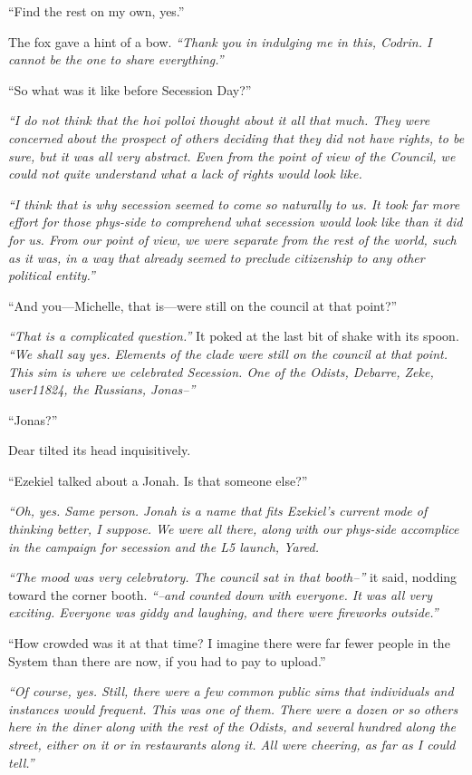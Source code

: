 ``Find the rest on my own, yes.''

The fox gave a hint of a bow. \emph{``Thank you in indulging me in this, Codrin. I cannot be the one to share everything.''}

``So what was it like before Secession Day?''

\emph{``I do not think that the hoi polloi thought about it all that much. They were concerned about the prospect of others deciding that they did not have rights, to be sure, but it was all very abstract. Even from the point of view of the Council, we could not quite understand what a lack of rights would look like.}

\emph{``I think that is why secession seemed to come so naturally to us. It took far more effort for those phys-side to comprehend what secession would look like than it did for us. From our point of view, we were separate from the rest of the world, such as it was, in a way that already seemed to preclude citizenship to any other political entity.''}

``And you---Michelle, that is---were still on the council at that point?''

\emph{``That is a complicated question.''} It poked at the last bit of shake with its spoon. \emph{``We shall say yes. Elements of the clade were still on the council at that point. This sim is where we celebrated Secession. One of the Odists, Debarre, Zeke, user11824, the Russians, Jonas--''}

``Jonas?''

Dear tilted its head inquisitively.

``Ezekiel talked about a Jonah. Is that someone else?''

\emph{``Oh, yes. Same person. Jonah is a name that fits Ezekiel's current mode of thinking better, I suppose. We were all there, along with our phys-side accomplice in the campaign for secession and the L5 launch, Yared.}

\emph{``The mood was very celebratory. The council sat in that booth--''} it said, nodding toward the corner booth. \emph{``--and counted down with everyone. It was all very exciting. Everyone was giddy and laughing, and there were fireworks outside.''}

``How crowded was it at that time? I imagine there were far fewer people in the System than there are now, if you had to pay to upload.''

\emph{``Of course, yes. Still, there were a few common public sims that individuals and instances would frequent. This was one of them. There were a dozen or so others here in the diner along with the rest of the Odists, and several hundred along the street, either on it or in restaurants along it. All were cheering, as far as I could tell.''}

